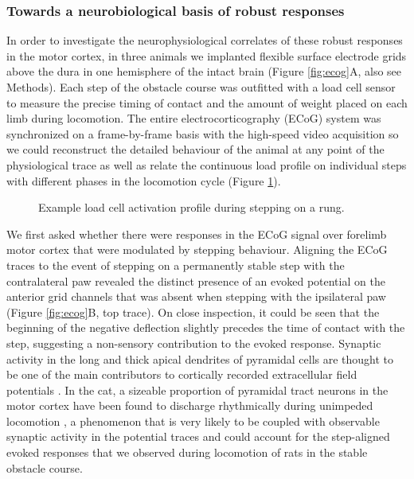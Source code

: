\subsubsection*{Towards a neurobiological basis of robust responses}

In order to investigate the neurophysiological correlates of these robust responses in the motor cortex, in three animals we implanted flexible surface electrode grids above the dura in one hemisphere of the intact brain (Figure \ref{fig:ecog}A, also see Methods). Each step of the obstacle course was outfitted with a load cell sensor to measure the precise timing of contact and the amount of weight placed on each limb during locomotion. The entire electrocorticography (ECoG) system was synchronized on a frame-by-frame basis with the high-speed video acquisition so we could reconstruct the detailed behaviour of the animal at any point of the physiological trace as well as relate the continuous load profile on individual steps with different phases in the locomotion cycle (Figure \ref{fig:loadCellProfile}).

\begin{figure}
\begin{center}

\end{center}
\vspace{-5mm}
\caption{Example load cell activation profile during stepping on a rung.}
\label{fig:loadCellProfile}
\end{figure}

We first asked whether there were responses in the ECoG signal over forelimb motor cortex that were modulated by stepping behaviour. Aligning the ECoG traces to the event of stepping on a permanently stable step with the contralateral paw revealed the distinct presence of an evoked potential on the anterior grid channels that was absent when stepping with the ipsilateral paw (Figure \ref{fig:ecog}B, top trace). On close inspection, it could be seen that the beginning of the negative deflection slightly precedes the time of contact with the step, suggesting a non-sensory contribution to the evoked response. Synaptic activity in the long and thick apical dendrites of pyramidal cells are thought to be one of the main contributors to cortically recorded extracellular field potentials \cite{Buzsaki2012}. In the cat, a sizeable proportion of pyramidal tract neurons in the motor cortex have been found to discharge rhythmically during unimpeded locomotion \cite{Armstrong1984a,Drew1996}, a phenomenon that is very likely to be coupled with observable synaptic activity in the potential traces and could account for the step-aligned evoked responses that we observed during locomotion of rats in the stable obstacle course.

